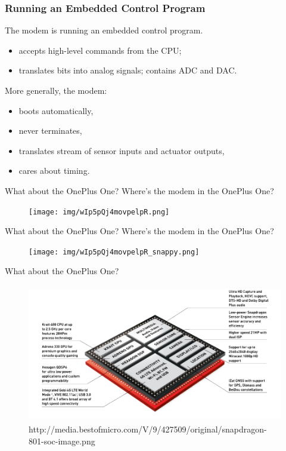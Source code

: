 \documentclass{beamer}
\begin{document}
\begin{frame}
\frametitle{Running an Embedded Control Program}

The modem is running an \alert{embedded control program}.
\begin{itemize}
\item accepts high-level commands from the CPU;
\item translates bits into analog signals; contains ADC and DAC.
\end{itemize}

\vspace{1em}More generally, the modem:
\begin{itemize}
\item boots automatically,
\item never terminates,
\item translates stream of sensor inputs and actuator outputs,
\item cares about timing.
\end{itemize}
\end{frame}

\begin{frame}{What about the OnePlus One?}
Where's the modem in the OnePlus One? \\
\begin{figure}[b]
\centering
\texttt{[image: img/wIp5pQj4movpelpR.png]}
\end{figure}
\end{frame}

\begin{frame}{What about the OnePlus One?}
Where's the modem in the OnePlus One? \\
\begin{figure}[b]
\centering
\texttt{[image: img/wIp5pQj4movpelpR\_snappy.png]}
\end{figure}
\end{frame}

\begin{frame}{What about the OnePlus One?}
\begin{figure}[b]
\centering
\includegraphics[width=\textwidth,height=6cm,keepaspectratio]{img/snapdragon-801-soc-image.png}
\captionsetup{labelformat=empty,font=scriptsize}
\caption{http://media.bestofmicro.com/V/9/427509/original/snapdragon-801-soc-image.png}
\end{figure}
\end{frame}
\end{document}

